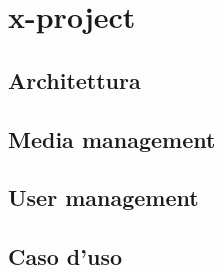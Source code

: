 \part{x-project}
	\label{seconda}
	

	\chapter{Architettura}
		\label{cha:architettura}
		

	\chapter{Media management}
		\label{cha:media_management}
		

	\chapter{User management}
		\label{cha:user_management}
		

	\chapter{Caso d'uso}
		\label{cha:caso_uso}
		